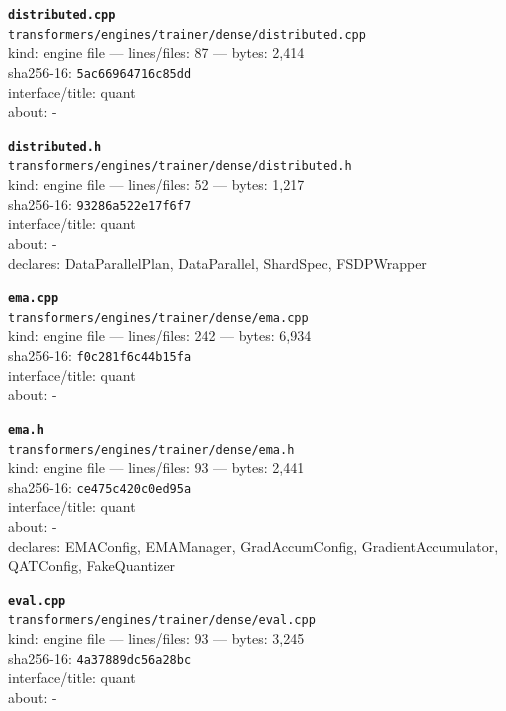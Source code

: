 \noindent\textbf{\texttt{distributed.cpp}}\\
\texttt{transformers/engines/trainer/dense/distributed.cpp}\\
kind: engine file --- lines/files: 87 --- bytes: 2,414\\
sha256-16: \texttt{5ac66964716c85dd}\\
interface/title: quant\\
about: -\\
\vspace*{6.0pt}

\noindent\textbf{\texttt{distributed.h}}\\
\texttt{transformers/engines/trainer/dense/distributed.h}\\
kind: engine file --- lines/files: 52 --- bytes: 1,217\\
sha256-16: \texttt{93286a522e17f6f7}\\
interface/title: quant\\
about: -\\
declares: DataParallelPlan, DataParallel, ShardSpec, FSDPWrapper\\
\vspace*{6.0pt}
\newpage

\noindent\textbf{\texttt{ema.cpp}}\\
\texttt{transformers/engines/trainer/dense/ema.cpp}\\
kind: engine file --- lines/files: 242 --- bytes: 6,934\\
sha256-16: \texttt{f0c281f6c44b15fa}\\
interface/title: quant\\
about: -\\
\vspace*{6.0pt}

\noindent\textbf{\texttt{ema.h}}\\
\texttt{transformers/engines/trainer/dense/ema.h}\\
kind: engine file --- lines/files: 93 --- bytes: 2,441\\
sha256-16: \texttt{ce475c420c0ed95a}\\
interface/title: quant\\
about: -\\
declares: EMAConfig, EMAManager, GradAccumConfig, GradientAccumulator, QATConfig, FakeQuantizer\\
\vspace*{6.0pt}

\noindent\textbf{\texttt{eval.cpp}}\\
\texttt{transformers/engines/trainer/dense/eval.cpp}\\
kind: engine file --- lines/files: 93 --- bytes: 3,245\\
sha256-16: \texttt{4a37889dc56a28bc}\\
interface/title: quant\\
about: -\\
\vspace*{6.0pt}

